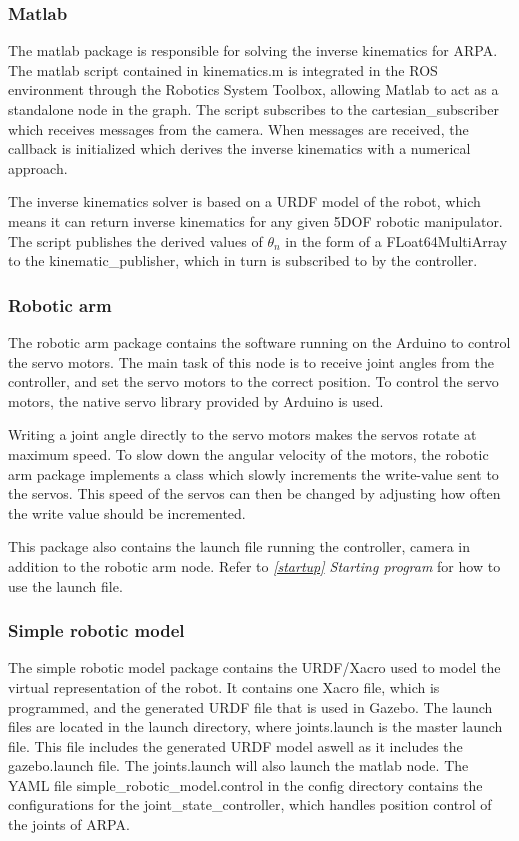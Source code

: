 \documentclass[11pt,a4paper, titlepage]{article}
\begin{document}
\subsubsection{Matlab}
The matlab package is responsible for solving the inverse kinematics for ARPA. The matlab script contained in kinematics.m is integrated in the ROS environment through the Robotics System Toolbox, allowing Matlab to act as a standalone node in the graph. The script subscribes to the cartesian\_subscriber which receives messages from the camera. When messages are received, the callback is initialized which derives the inverse kinematics with a numerical approach.

The inverse kinematics solver is based on a URDF model of the robot, which means it can return inverse kinematics for any given 5DOF robotic manipulator. The script publishes the derived values of $\theta_n$ in the form of a FLoat64MultiArray to the kinematic\_publisher, which in turn is subscribed to by the controller.

\subsubsection{Robotic arm}
The robotic arm package contains the software running on the Arduino to control the servo motors. The main task of this node is to receive joint angles from the controller, and set the servo motors to the correct position. To control the servo motors, the native servo library provided by Arduino is used.

Writing a joint angle directly to the servo motors makes the servos rotate at maximum speed. To slow down the angular velocity of the motors, the robotic arm package implements a class which slowly increments the write-value sent to the servos. This speed of the servos can then be changed by adjusting how often the write value should be incremented.

This package also contains the launch file running the controller, camera in addition to the robotic arm node. Refer to \textit{\ref{startup} Starting program} for how to use the launch file.
	

\subsubsection{Simple robotic model}
The simple robotic model package contains the URDF/Xacro used to model the virtual representation of the robot. It contains one Xacro file, which is programmed, and the generated URDF file that is used in Gazebo. The launch files are located in the launch directory, where joints.launch is the master launch file. This file includes the generated URDF model aswell as it includes the gazebo.launch file. The joints.launch will also launch the matlab node. The YAML file simple\_robotic\_model.control in the config directory contains the configurations for the joint\_state\_controller, which handles position control of the joints of ARPA.
	
\end{document}
